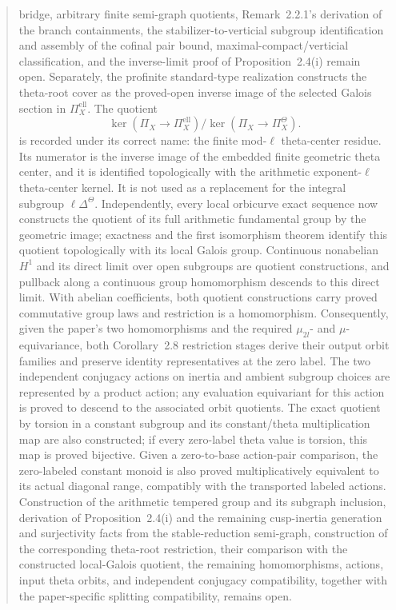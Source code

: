 \documentclass[11pt]{article}
\theoremstyle{plain}
\theoremstyle{definition}
\theoremstyle{remark}
\begin{document}
\begin{abstract}
bridge, arbitrary finite semi-graph quotients, Remark~2.2.1's derivation of the branch containments,
the stabilizer-to-verticial subgroup identification and assembly of the
cofinal pair bound,
maximal-compact/verticial classification, and the inverse-limit proof of
Proposition~2.4(i) remain open.
Separately, the
profinite standard-type realization constructs the theta-root cover as the
proved-open inverse image of the selected Galois section in
\(\Pi_X^{\mathrm{ell}}\).  The quotient
\[
 \ker(\Pi_X\longrightarrow\Pi_X^{\mathrm{ell}})/
 \ker(\Pi_X\longrightarrow\Pi_X^\Theta).
\]
is recorded under its correct name: the finite mod-\(\ell\) theta-center
residue.  Its numerator is the inverse image of the embedded finite geometric
theta center, and it is identified topologically with the arithmetic
exponent-\(\ell\) theta-center kernel.  It is not used as a replacement for
the integral subgroup \(\ell\Delta^\Theta\).  Independently,
every local orbicurve exact sequence now constructs the quotient of its full
arithmetic fundamental group by the geometric image; exactness and the first
isomorphism theorem identify this quotient topologically with its local Galois
group.  Continuous nonabelian
\(H^1\) and its direct limit over open subgroups are quotient constructions,
and pullback along a continuous group homomorphism descends to this direct
limit.  With abelian coefficients, both quotient constructions carry proved
commutative group laws and restriction is a homomorphism.  Consequently, given
the paper's two homomorphisms and the required
\(\mu_{2l}\)- and \(\mu\)-equivariance, both Corollary~2.8 restriction stages
derive their output orbit families and preserve identity representatives at
the zero label.  The two independent conjugacy actions on inertia and ambient
subgroup choices are represented by a product action; any evaluation
equivariant for this action is proved to descend to the associated orbit
quotients.  The exact quotient by torsion in a constant subgroup and its
constant/theta multiplication map are also constructed; if every zero-label
theta value is torsion, this map is proved bijective.  Given a zero-to-base
action-pair comparison, the zero-labeled constant monoid is also proved
multiplicatively equivalent to its actual diagonal range, compatibly with the
transported labeled actions.  Construction of the arithmetic tempered group
and its subgraph inclusion, derivation of Proposition~2.4(i) and the remaining
cusp-inertia generation and surjectivity facts from the stable-reduction
semi-graph, construction of the corresponding theta-root restriction, their
comparison with the constructed local-Galois quotient, the remaining
homomorphisms, actions, input theta orbits, and independent conjugacy
compatibility, together with the paper-specific splitting compatibility,
remains open.


\end{abstract}
\end{document}
